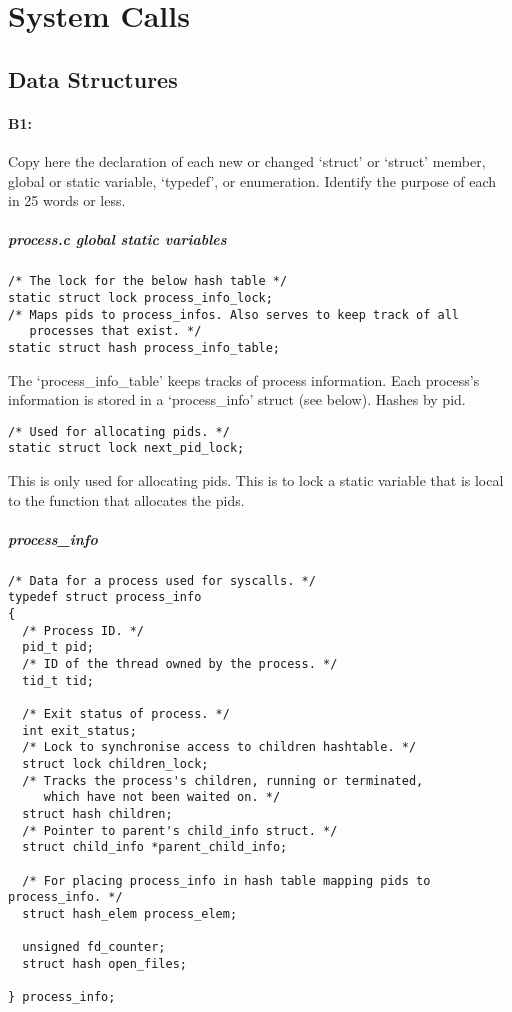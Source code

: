 \section{System Calls}
\subsection{Data Structures}
\paragraph{B1:} %
Copy here the declaration of each new or changed `struct' or `struct' member, global or static variable, `typedef', or enumeration.  Identify the purpose of each in 25 words or less.

\subparagraph{process.c global static variables}

\begin{verbatim}
/* The lock for the below hash table */
static struct lock process_info_lock;
/* Maps pids to process_infos. Also serves to keep track of all
   processes that exist. */
static struct hash process_info_table;
\end{verbatim}

The `process\_info\_table' keeps tracks of process information. Each process's
information is stored in a `process\_info' struct (see below). Hashes by pid.

\begin{verbatim}
/* Used for allocating pids. */
static struct lock next_pid_lock;
\end{verbatim}

This is only used for allocating pids. This is to lock a static variable that
is local to the function that allocates the pids.

\subparagraph{process\_info}

\begin{verbatim}
/* Data for a process used for syscalls. */
typedef struct process_info
{
  /* Process ID. */
  pid_t pid;
  /* ID of the thread owned by the process. */
  tid_t tid;

  /* Exit status of process. */
  int exit_status;
  /* Lock to synchronise access to children hashtable. */
  struct lock children_lock;
  /* Tracks the process's children, running or terminated,
     which have not been waited on. */
  struct hash children;
  /* Pointer to parent's child_info struct. */
  struct child_info *parent_child_info;

  /* For placing process_info in hash table mapping pids to process_info. */
  struct hash_elem process_elem;

  unsigned fd_counter;
  struct hash open_files;

} process_info;
\end{verbatim}

